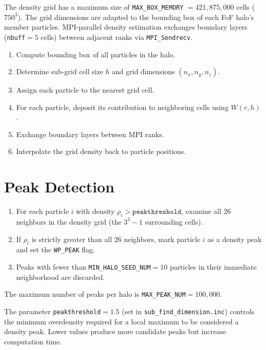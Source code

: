 \documentclass[11pt,fleqn]{book}
\newcommand{\code}[1]{\texttt{#1}}
\newcommand{\file}[1]{\texttt{#1}}
\begin{document}
The density grid has a maximum size of \code{MAX\_BOX\_MEMORY} $= 421{,}875{,}000$ cells ($750^3$).  The grid dimensions are adapted to the bounding box of each FoF halo's member particles.  MPI-parallel density estimation exchanges boundary layers (\code{nbuff}${}=5$ cells) between adjacent ranks via \code{MPI\_Sendrecv}.

\begin{algorithm}
\begin{enumerate}[leftmargin=2em]
  \item Compute bounding box of all particles in the halo.
  \item Determine sub-grid cell size $h$ and grid dimensions $(n_x, n_y, n_z)$.
  \item Assign each particle to the nearest grid cell.
  \item For each particle, deposit its contribution to neighboring cells using $W(r,h)$.
  \item Exchange boundary layers between MPI ranks.
  \item Interpolate the grid density back to particle positions.
\end{enumerate}
\end{algorithm}

\section{Peak Detection}

\begin{algorithm}
\begin{enumerate}[leftmargin=2em]
  \item For each particle $i$ with density $\rho_i > \code{peakthreshold}$, examine all 26 neighbors in the density grid (the $3^3 - 1$ surrounding cells).
  \item If $\rho_i$ is strictly greater than all 26 neighbors, mark particle $i$ as a density peak and set the \code{WP\_PEAK} flag.
  \item Peaks with fewer than \code{MIN\_HALO\_SEED\_NUM}${}=10$ particles in their immediate neighborhood are discarded.
\end{enumerate}
The maximum number of peaks per halo is \code{MAX\_PEAK\_NUM}${}=100{,}000$.
\end{algorithm}

\begin{infobox}
The parameter \code{peakthreshold}${}=1.5$ (set in \file{sub\_find\_dimension.inc}) controls the minimum overdensity required for a local maximum to be considered a density peak.  Lower values produce more candidate peaks but increase computation time.
\end{infobox}
\end{document}
